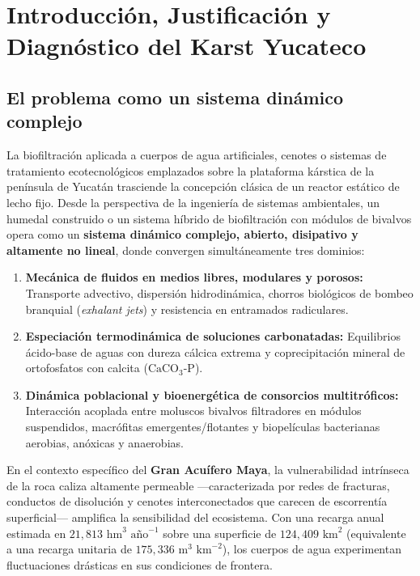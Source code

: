 \documentclass[11pt,letterpaper]{article}
\begin{document}
\tableofcontents
\newpage

\section{Introducción, Justificación y Diagnóstico del Karst Yucateco}

\subsection{El problema como un sistema dinámico complejo}
La biofiltración aplicada a cuerpos de agua artificiales, cenotes o sistemas de tratamiento ecotecnológicos emplazados sobre la plataforma kárstica de la península de Yucatán trasciende la concepción clásica de un reactor estático de lecho fijo. Desde la perspectiva de la ingeniería de sistemas ambientales, un humedal construido o un sistema híbrido de biofiltración con módulos de bivalvos opera como un \textbf{sistema dinámico complejo, abierto, disipativo y altamente no lineal}, donde convergen simultáneamente tres dominios:
\begin{enumerate}[leftmargin=1.5em]
    \item \textbf{Mecánica de fluidos en medios libres, modulares y porosos:} Transporte advectivo, dispersión hidrodinámica, chorros biológicos de bombeo branquial (\textit{exhalant jets}) y resistencia en entramados radiculares.
    \item \textbf{Especiación termodinámica de soluciones carbonatadas:} Equilibrios ácido-base de aguas con dureza cálcica extrema y coprecipitación mineral de ortofosfatos con calcita ($\text{CaCO}_3\text{-P}$).
    \item \textbf{Dinámica poblacional y bioenergética de consorcios multitróficos:} Interacción acoplada entre moluscos bivalvos filtradores en módulos suspendidos, macrófitas emergentes/flotantes y biopelículas bacterianas aerobias, anóxicas y anaerobias.
\end{enumerate}

En el contexto específico del \textbf{Gran Acuífero Maya}, la vulnerabilidad intrínseca de la roca caliza altamente permeable ---caracterizada por redes de fracturas, conductos de disolución y cenotes interconectados que carecen de escorrentía superficial--- amplifica la sensibilidad del ecosistema. Con una recarga anual estimada en $21,813\text{ hm}^3\text{ año}^{-1}$ sobre una superficie de $124,409\text{ km}^2$ (equivalente a una recarga unitaria de $175,336\text{ m}^3\text{ km}^{-2}$), los cuerpos de agua experimentan fluctuaciones drásticas en sus condiciones de frontera.
\end{document}
